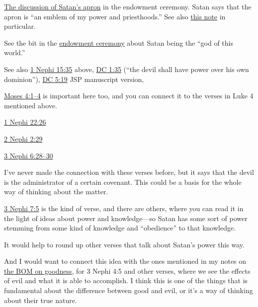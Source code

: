 \begin{compactitem}
			\item \hyperref[TEMPLE-ENDOWMENT-ENDOW-PRE-1990-GARDEN]{The discussion of Satan's apron} in the endowment ceremony. Satan says that the apron is ``an emblem of my power and priesthoods.'' See also \hyperref[ENDOWMENT-apron]{this note} in particular.
			\item See the bit in the \hyperref[TEMPLE-ENDOWMENT-ENDOW-PRE-1990-TELESTIAL]{endowment ceremony} about Satan being the ``god of this world.''
				\begin{compactitem}
					\item See also \hyperref[1NEPHI-15-35]{1 Nephi 15:35} above, \hyperref[DC1-35]{DC 1:35} (``the devil shall have power over his own dominion''), \hyperref[DC5-19]{DC 5:19} JSP manuscript version, 
				\end{compactitem}
			\item \hyperref[MOSES-4-1]{Moses 4:1--4} is important here too, and you can connect it to the verses in Luke 4 mentioned above.
			\item \hyperref[1NEPHI-22-26]{1 Nephi 22:26}
			\item \hyperref[2NEPHI-2-29]{2 Nephi 2:29}
			\item \hyperref[3NEPHI-6-28]{3 Nephi 6:28--30}
				\begin{compactitem}
					\item I've never made the connection with these verses before, but it says that the devil is the administrator of a certain covenant. This could be a basis for the whole way of thinking about the matter.
				\end{compactitem}
			\item \hyperref[3NEPHI-7-5]{3 Nephi 7:5} is the kind of verse, and there are others, where you can read it in the light of ideas about power and knowledge---so Satan has some sort of power stemming from some kind of knowledge and ``obedience'' to that knowledge.
				\begin{compactitem}
					\item It would help to round up other verses that talk about Satan's power this way.
					\item And I would want to connect this idea with the ones mentioned in my notes on \hyperref[GOODNESS-BOM]{the BOM on goodness}, for 3 Nephi 4:5 and other verses, where we see the effects of evil and what it is able to accomplish. I think this is one of the things that is fundamental about the difference between good and evil, or it's a way of thinking about their true nature.
				\end{compactitem}

\end{compactitem}
